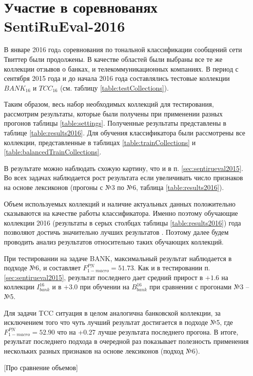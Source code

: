 \section{Участие в соревнованях SentiRuEval-2016}
\label{sec:sentirueval2016}

В январе 2016 годa соревнования по тональной классификации сообщений
сети Твиттер были продолжены.
В качестве областей были выбраны все те же коллекции отзывов о банках,
и телекоммуникационных компаниях. В период с сентября 2015 года и до начала
2016 года составлялись тестовые коллекции $BANK_{16}$ и $TCC_{16}$ (см.
таблицу \ref{table:testCollections}).

Таким образом, весь набор необходимых коллекций для тестирования, рассмотрим
результаты, которые были получены при применении разных прогонов таблицы
\ref{table:settings}.
Полученные результаты представлены в таблице \ref{table:results2016}.
Для обучения классификатора были рассмотрены все коллекции, представленные в
таблицах \ref{table:trainCollections} и \ref{table:balancedTrainCollections}.



В результате можно наблюдать схожую картину, что и в п. \ref{sec:sentirueval2015}.
Во всех задачах наблюдается рост результата если увеличивать число признаков
на основе лексиконов (прогоны с №3 по №6, таблица \ref{table:results2016}).

Объем используемых коллекций и наличие актуальных данных положительно сказываются
на качестве работы классификатора.
Именно поэтому обучающие коллекции 2016
(результаты в серых столбцах таблицы \ref{table:results2016})
года позволяют достичь значительно лучших результатов .
Поэтому далее будем проводить анализ результатов относительно
таких обучающих коллекций.

При тестировании на задаче BANK, максимальный результат наблюдается
в подходе №6, и составляет $F_{1-macro}^{PN} = 51.73$.
Как и в тестировании п. \ref{sec:sentirueval2015}, результат последнего
дает средний прирост в $+1.6$ на коллекции $I_{bank}^{16}$ и в $+3.0$
при обучении на $B_{bank}^{16}$ при сравнении с прогонами №3 -- №5.

Для задачи TCC ситуация в целом аналогична банковской коллекции, за исключением
того что чуть лучший результат достигается в подходе №5, где
$F_{1-macro}^{PN} = 52.90$
что на +0.27 лучше результата последнего прогона.
В итоге, результат последнего подхода в очередной раз показывает полезность
применения нескольких разных признаков на основе лексиконов (подход №6).


[Про сравнение объемов]
